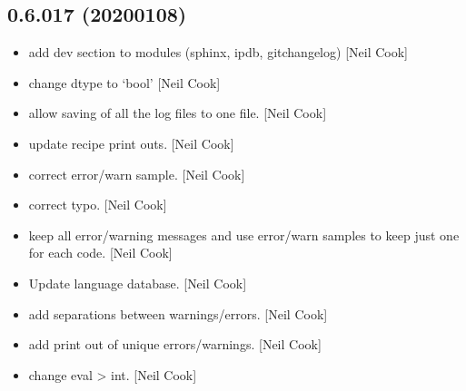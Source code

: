 \documentclass[a4paper,10pt,english]{report}
\begin{document}
\subsection{0.6.017 (2020\sphinxhyphen{}01\sphinxhyphen{}08)}
\label{\detokenize{misc/changelog:id21}}\begin{itemize}
\item {} 
 \sphinxhyphen{} add dev section to modules (sphinx, ipdb,
gitchangelog) {[}Neil Cook{]}

\item {} 
 \sphinxhyphen{} change dtype to
‘bool’ {[}Neil Cook{]}

\item {} 
 \sphinxhyphen{} allow saving of all the log
files to one file. {[}Neil Cook{]}

\item {} 
 \sphinxhyphen{} update recipe print outs.
{[}Neil Cook{]}

\item {} 
 \sphinxhyphen{} correct error/warn sample.
{[}Neil Cook{]}

\item {} 
 \sphinxhyphen{} correct typo. {[}Neil Cook{]}

\item {} 
 \sphinxhyphen{} keep all error/warning
messages and use error/warn samples to keep just one for each code.
{[}Neil Cook{]}

\item {} 
Update language database. {[}Neil Cook{]}

\item {} 
 \sphinxhyphen{} add separations between
warnings/errors. {[}Neil Cook{]}

\item {} 
 \sphinxhyphen{} add print out of unique
errors/warnings. {[}Neil Cook{]}

\item {} 
 \sphinxhyphen{} change eval \textendash{}\textgreater{} int. {[}Neil
Cook{]}


\end{itemize}
\end{document}

